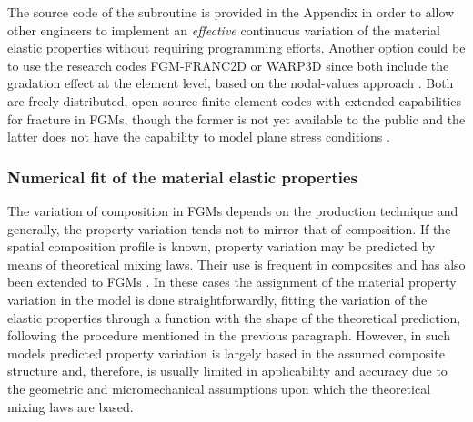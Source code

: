 The source code of the subroutine is provided in the Appendix in order to allow other engineers to implement an \textit{effective} continuous variation of the material elastic properties without requiring programming efforts. Another option could be to use the research codes FGM-FRANC2D \citep{Kim2003b} or WARP3D \citep{WARP3D} since both include the gradation effect at the element level, based on the nodal-values approach \citep{Kim2002}. Both are freely distributed, open-source finite element codes with extended capabilities for fracture in FGMs, though the former is not yet available to the public and the latter does not have the capability to model plane stress conditions \citep{Walters2006}.

\subsubsection{Numerical fit of the material elastic properties}

The variation of composition in FGMs depends on the production technique \citep{Lambros1999,Butcher1999,Parameswaran2000} and generally, the property variation tends not to mirror that of composition. If the spatial composition profile is known, property variation may be predicted by means of theoretical mixing laws. Their use is frequent in composites \citep{Hashin1983} and has also been extended to FGMs \citep{Reiter1997,Gasik1998}. In these cases the assignment of the material property variation in the model is done straightforwardly, fitting the variation of the elastic properties through a function with the shape of the theoretical prediction, following the procedure mentioned in the previous paragraph. However, in such models predicted property variation is largely based in the assumed composite structure and, therefore, is usually limited in applicability and accuracy due to the geometric and micromechanical assumptions upon which the theoretical mixing laws are based.

